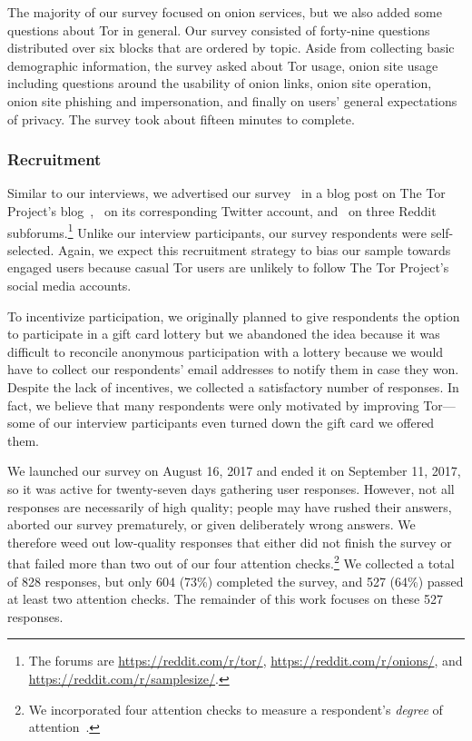 The majority of our survey focused on onion services, but we also added some
questions about Tor in general.  Our survey consisted of forty-nine questions
distributed over six blocks that are ordered by topic. Aside from collecting
basic demographic information, the survey asked about Tor usage, onion site
usage including questions around the usability of onion links, onion site
operation, onion site phishing and impersonation, and finally on users' general
expectations of privacy. The survey took about fifteen minutes to complete.

\subsubsection{Recruitment}

Similar to our interviews, we advertised our survey \first~in a blog post on The
Tor Project's blog~\cite{Winter2017a}, \second~on its corresponding Twitter
account, and \third~on three Reddit subforums.\footnote{The forums are
\url{https://reddit.com/r/tor/}, \url{https://reddit.com/r/onions/}, and
\url{https://reddit.com/r/samplesize/}.}  Unlike our interview participants,
our survey respondents were self-selected.  Again, we expect this recruitment
strategy to bias our sample towards engaged users because casual Tor users are
unlikely to follow The Tor Project's social media accounts.

To incentivize participation, we originally planned to give respondents the
option to participate in a gift card lottery but we abandoned the idea because
it was difficult to reconcile anonymous participation with a lottery because we
would have to collect our respondents' email addresses to notify them in case
they won.  Despite the lack of incentives, we collected a satisfactory number of
responses.  In fact, we believe that many respondents were only motivated by
improving Tor---some of our interview participants even turned down the gift
card we offered them.

We launched our survey on August 16, 2017 and ended it on September 11, 2017, so
it was active for twenty-seven days gathering user responses.  However, not all
responses are necessarily of high quality; people may have rushed their answers,
aborted our survey prematurely, or given deliberately wrong answers.  We
therefore weed out low-quality responses that either did not finish the survey
or that failed more than two out of our four attention checks.\footnote{We
incorporated four attention checks to measure a respondent's \emph{degree} of
attention~\cite{Berinsky2014a}.} We collected a total of 828 responses, but only
604 (73\%) completed the survey, and 527 (64\%) passed at least two attention
checks.  The remainder of this work focuses on these 527 responses.

